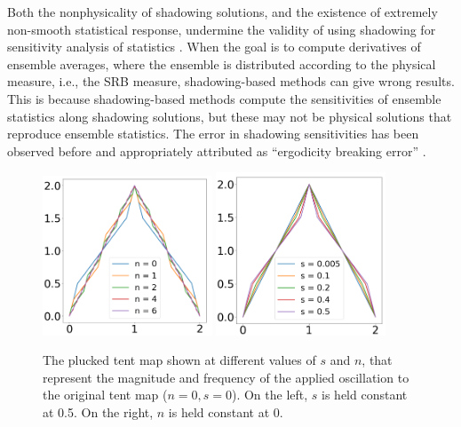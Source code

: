 Both the nonphysicality of shadowing solutions, and the existence of extremely non-smooth statistical response, undermine the validity of using shadowing for sensitivity analysis of statistics \cite{qiqi-lss}\cite{angxiu-lss}\cite{lasagna}. When the goal is to compute derivatives of ensemble averages, where the ensemble
is distributed according to the physical measure, i.e., the SRB measure, shadowing-based methods can give wrong results. This is because shadowing-based methods compute the sensitivities of ensemble statistics along shadowing solutions, but these may not be physical solutions that reproduce ensemble statistics. The error in shadowing sensitivities has been observed
before and appropriately attributed as ``ergodicity breaking error'' \cite{patrick} \cite{angxiu-error}. 
\begin{figure}
    \centering
    \includegraphics[width=0.45\textwidth]{osc_tent_n.png}
    \includegraphics[width=0.45\textwidth]{osc_tent_s.png}
    \caption{The plucked tent map shown at different values of $s$ and $n$, that represent the magnitude and frequency of the applied oscillation to the original tent map ($n=0,s=0$). On the left, $s$ is held constant at 0.5. On the right, $n$ is held constant at 0.}
    \label{fig:pluckedTentMap}
\end{figure}
